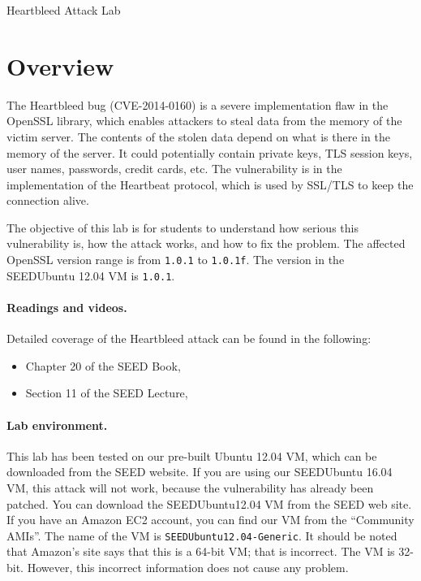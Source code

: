 



\newcommand{\heartFigs}{./Figs}




\begin{center}
{\LARGE Heartbleed Attack Lab}
\end{center}




\section{Overview}



The Heartbleed bug (CVE-2014-0160) is a severe implementation flaw in the
OpenSSL library, which enables attackers to steal data 
from the memory of the victim server. The contents of the stolen data
depend on what is there in the memory of the server. It could
potentially contain private keys, TLS session keys, user names,
passwords, credit cards, etc. The vulnerability is in the implementation of
the Heartbeat protocol,  which is used by SSL/TLS to keep the connection alive. 


The objective of this lab is for students to understand how serious this
vulnerability is, how the attack works, and how to fix the problem. The
affected OpenSSL version range is from {\tt 1.0.1} to {\tt 1.0.1f}. The
version in the SEEDUbuntu 12.04 VM is {\tt 1.0.1}. 



\paragraph{Readings and videos.}
Detailed coverage of the Heartbleed attack can be found in the following:

\begin{itemize}
\item Chapter 20 of the SEED Book, \seedbook
\item Section 11 of the SEED Lecture, \seedisvideo
\end{itemize}



\paragraph{Lab environment.} This lab has been tested on our pre-built
Ubuntu 12.04 VM, which can be downloaded from the SEED website.
If you are using our SEEDUbuntu 16.04 VM, this attack will not work, because the
vulnerability has already been patched.
You can download the SEEDUbuntu12.04 VM from the SEED web
site. If you have an Amazon EC2 account, you can find our VM from
the ``Community AMIs''. The name of the VM is
\texttt{SEEDUbuntu12.04-Generic}. It should be noted that
Amazon's site says that this is a 64-bit VM; that is incorrect. The VM is
32-bit. However, this incorrect information does not cause any problem.






